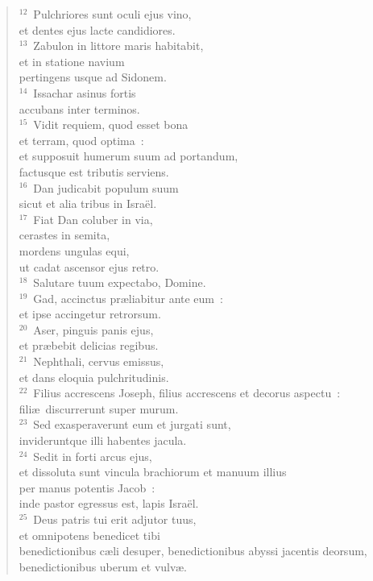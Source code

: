 \begin{flushleft}
\begin{verse}
${}^{12}$~Pulchriores sunt oculi ejus vino,\\ et dentes ejus lacte candidiores.\\
${}^{13}$~Zabulon in littore maris habitabit,\\ et in statione navium\\ pertingens usque ad Sidonem.\\
${}^{14}$~Issachar asinus fortis\\ accubans inter terminos.\\
${}^{15}$~Vidit requiem, quod esset bona\\ et terram, quod optima~:\\ et supposuit humerum suum ad portandum,\\ factusque est tributis serviens.\\
${}^{16}$~Dan judicabit populum suum\\ sicut et alia tribus in Isra\"el.\\
${}^{17}$~Fiat Dan coluber in via,\\ cerastes in semita,\\ mordens ungulas equi,\\ ut cadat ascensor ejus retro.\\
${}^{18}$~Salutare tuum expectabo, Domine.\\
${}^{19}$~Gad, accinctus pr\ae liabitur ante eum~:\\ et ipse accingetur retrorsum.\\
${}^{20}$~Aser, pinguis panis ejus,\\ et pr\ae bebit delicias regibus.\\
${}^{21}$~Nephthali, cervus emissus,\\ et dans eloquia pulchritudinis.\\
${}^{22}$~Filius accrescens Joseph, filius accrescens et decorus aspectu~:\\ fili\ae\ discurrerunt super murum.\\
${}^{23}$~Sed exasperaverunt eum et jurgati sunt,\\ invideruntque illi habentes jacula.\\
${}^{24}$~Sedit in forti arcus ejus,\\ et dissoluta sunt vincula brachiorum et manuum illius\\ per manus potentis Jacob~:\\ inde pastor egressus est, lapis Isra\"el.\\
${}^{25}$~Deus patris tui erit adjutor tuus,\\ et omnipotens benedicet tibi\\ benedictionibus c\ae li desuper, benedictionibus abyssi jacentis deorsum,\\ benedictionibus uberum et vulv\ae .\\

\end{verse}
\end{flushleft}
